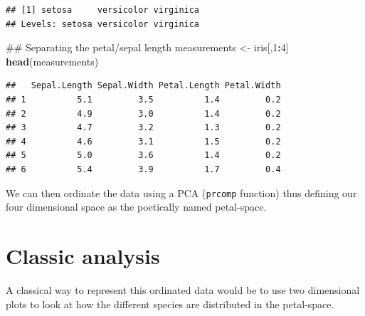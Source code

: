 \documentclass[]{book}
\newenvironment{Shaded}{\begin{snugshade}}{\end{snugshade}}
\newcommand{\KeywordTok}[1]{\textcolor[rgb]{0.13,0.29,0.53}{\textbf{#1}}}
\newcommand{\DecValTok}[1]{\textcolor[rgb]{0.00,0.00,0.81}{#1}}
\newcommand{\StringTok}[1]{\textcolor[rgb]{0.31,0.60,0.02}{#1}}
\newcommand{\OperatorTok}[1]{\textcolor[rgb]{0.81,0.36,0.00}{\textbf{#1}}}
\newcommand{\NormalTok}[1]{#1}
\theoremstyle{definition}
\theoremstyle{definition}
\theoremstyle{remark}
\begin{document}
\begin{verbatim}
## [1] setosa     versicolor virginica 
## Levels: setosa versicolor virginica
\end{verbatim}

\begin{Shaded}
\begin{Highlighting}[]
\NormalTok{## Separating the petal/sepal length}
\NormalTok{measurements <-}\StringTok{ }\NormalTok{iris[,}\DecValTok{1}\OperatorTok{:}\DecValTok{4}\NormalTok{]}
\KeywordTok{head}\NormalTok{(measurements)}
\end{Highlighting}
\end{Shaded}

\begin{verbatim}
##   Sepal.Length Sepal.Width Petal.Length Petal.Width
## 1          5.1         3.5          1.4         0.2
## 2          4.9         3.0          1.4         0.2
## 3          4.7         3.2          1.3         0.2
## 4          4.6         3.1          1.5         0.2
## 5          5.0         3.6          1.4         0.2
## 6          5.4         3.9          1.7         0.4
\end{verbatim}

We can then ordinate the data using a PCA (\texttt{prcomp} function)
thus defining our four dimensional space as the poetically named
petal-space.

\begin{Shaded}
\end{Shaded}

\section{Classic analysis}\label{classic-analysis}

A classical way to represent this ordinated data would be to use two
dimensional plots to look at how the different species are distributed
in the petal-space.
\end{document}

